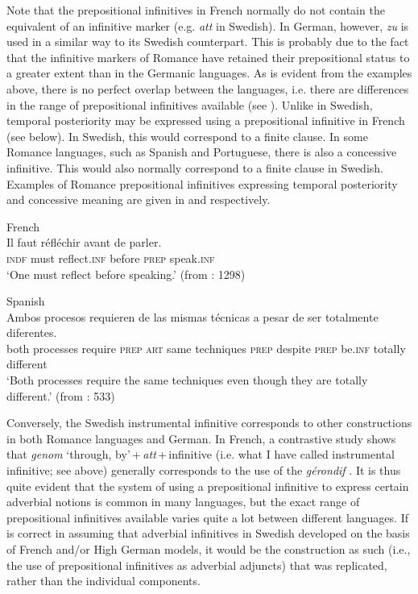\documentclass[output=paper]{langscibook}
\begin{document}
Note that the prepositional infinitives in French normally do not contain the equivalent of an infinitive marker (e.g. \textit{att} in Swedish). In German, however, \textit{zu} is used in a similar way to its Swedish counterpart. This is probably due to the fact that the infinitive markers of Romance have retained their prepositional status to a greater extent than in the Germanic languages. As is evident from the examples above, there is no perfect overlap between the languages, i.e. there are differences in the range of prepositional infinitives available (see \citealt{Hengenveld1998}). Unlike in Swedish, temporal posteriority may be expressed using a prepositional infinitive in French (see  below). In Swedish, this would correspond to a finite clause. In some Romance languages, such as Spanish and Portuguese, there is also a concessive infinitive. This would also normally correspond to a finite clause in Swedish. Examples of Romance prepositional infinitives expressing temporal posteriority and concessive meaning are given in  and  respectively. 


\ea
\label{ex:kalm:5}
\ea French\label{ex:kalm:5a}\\ 
\gll Il faut réfléchir avant de parler.\\
\textsc{indf} must reflect.\textsc{inf} before \textsc{prep} speak.\textsc{inf}\\
\glt ‘One must reflect before speaking.’ (from \citealt{Grevisse1993}: 1298) 

\ex Spanish\label{ex:kalm:5b}\\ 
\gll Ambos procesos requieren de las mismas técnicas a pesar de ser totalmente diferentes.\\
both processes require \textsc{prep} \textsc{art} same techniques \textsc{prep} despite \textsc{prep} be.\textsc{inf} totally different\\
\glt ‘Both processes require the same techniques even though they are totally different.’ (from \citealt{Schulte2007What}: 533)
\z 
\z 



Conversely, the Swedish instrumental infinitive corresponds to other constructions in both Romance languages and German. In French, a contrastive study shows that \textit{genom} ‘through, by’\,+\,\textit{att}\,+\,infinitive (i.e. what I have called instrumental infinitive; see  above) generally corresponds to the use of the \textit{gérondif} \citep[128]{Hellqvist2015}. It is thus quite evident that the system of using a prepositional infinitive to express certain adverbial notions is common in many languages, but the exact range of prepositional infinitives available varies quite a lot between different languages. If \citet{Holm1967} is correct in assuming that adverbial infinitives in Swedish developed on the basis of French and/or High German models, it would be the construction as such (i.e., the use of prepositional infinitives as adverbial adjuncts) that was replicated, rather than the individual components. 
\end{document}
